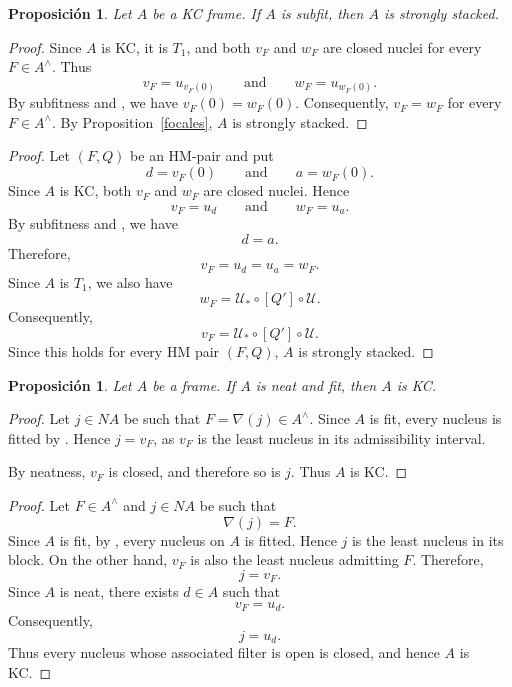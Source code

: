 \documentclass[11pt]{amsart}
\theoremstyle{plain}
\newtheorem{prop}[thm]{Proposición}
\theoremstyle{definition}
\begin{document}
\begin{prop}\label{KCsfitSS}
Let $A$ be a KC frame. If $A$ is subfit, then $A$ is strongly
stacked.
\end{prop}

\begin{proof}
Since $A$ is KC, it is $T_1$, and both
$v_F$ and $w_F$ are closed nuclei for every
$F\in A^\wedge$. Thus
\[
v_F=u_{v_F(0)}
\qquad\text{and}\qquad
w_F=u_{w_F(0)}.
\]
By subfitness and \cite[Theorem 3.5]{simmons2006regularity},
we have $v_F(0)=w_F(0)$. Consequently,
$v_F=w_F$ for every $F\in A^\wedge$.
By Proposition~\ref{focales}, $A$ is strongly stacked.
\end{proof}

\begin{proof}
Let $(F,Q)$ be an HM-pair and put
\[
d=v_F(0)
\qquad\text{and}\qquad
a=w_F(0).
\]
Since $A$ is KC, both $v_F$ and $w_F$ are closed nuclei. Hence
\[
v_F=u_d
\qquad\text{and}\qquad
w_F=u_a.
\]
By subfitness and \cite[Theorem~3.5]{simmons2006regularity}, we have
\[
d=a.
\]
Therefore,
\[
v_F=u_d=u_a=w_F.
\]
Since $A$ is $T_1$, we also have
\[
w_F=\mathcal{U}_*\circ[Q']\circ\mathcal{U}.
\]
Consequently,
\[
v_F=\mathcal{U}_*\circ[Q']\circ\mathcal{U}.
\]
Since this holds for every HM pair $(F,Q)$, $A$ is strongly stacked.
\end{proof}


\begin{prop}\label{NeatfitKC}
Let \(A\) be a frame. If \(A\) is neat and fit, then \(A\) is KC.
\end{prop}

\begin{proof}
Let $j\in NA$ be such that
$F=\nabla(j)\in A^\wedge$.
Since $A$ is fit, every nucleus is fitted
by \cite[Theorem 3.4]{simmons2006regularity}. Hence
$j=v_F$, as $v_F$ is the least nucleus
in its admissibility interval.

By neatness, $v_F$ is closed, and therefore
so is $j$. Thus $A$ is KC.
\end{proof}

\begin{proof}
Let \(F\in A^\wedge\) and \(j\in NA\) be such that
\[
\nabla(j)=F.
\]
Since \(A\) is fit, by \cite[Theorem 3.4]{simmons2006regularity}, every nucleus on \(A\) is fitted. Hence \(j\) is the
least nucleus in its block. On the other hand, \(v_F\) is also the least
nucleus admitting \(F\). Therefore,
\[
j=v_F.
\]
Since \(A\) is neat, there exists \(d\in A\)
such that
\[
v_F=u_d.
\]
Consequently,
\[
j=u_d.
\]
Thus every nucleus whose associated filter is open is closed, and hence
\(A\) is KC.
\end{proof}

%


\end{document}
